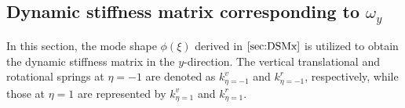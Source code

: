 \documentclass[preprint,12pt]{elsarticle}
\begin{document}
\subsection{Dynamic stiffness matrix corresponding to $\omega_y$}\label{sec:DSMy}
%
%
In this section, the mode shape $\phi(\xi)$ derived in $\Cref{sec:DSMx}$ is utilized to obtain the dynamic stiffness matrix in the $y$-direction.  
The vertical translational and rotational springs at $\eta = -1$ are denoted as $k^v_{\eta = -1}$ and $k^r_{\eta = -1}$, respectively, while those at $\eta = 1$ are represented by $k^v_{\eta = 1}$ and $k^r_{\eta = 1}$.
\end{document}
